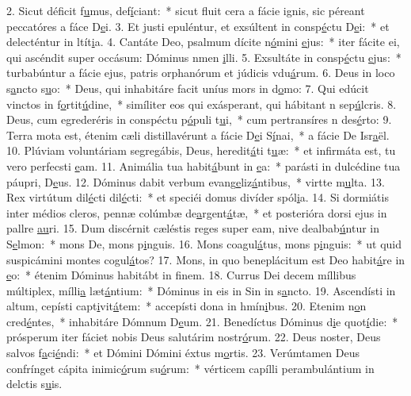2. Sicut déficit f\uline{u}mus, def\uline{í}ciant:~* sicut fluit cera a fácie ignis, sic péreant peccatóres a fáce D\uline{e}i.
3. Et justi epuléntur, et exsúltent in consp\uline{é}ctu D\uline{e}i:~* et delecténtur in ltít\uline{i}a.
4. Cantáte Deo, psalmum dícite n\uline{ó}mini \uline{e}jus:~* iter fácite ei, qui ascéndit super occásum: Dóminus nmen \uline{i}lli.
5. Exsultáte in consp\uline{é}ctu \uline{e}jus:~* turbabúntur a fácie ejus, patris orphanórum et júdicis vdu\uline{á}rum.
6. Deus in loco s\uline{a}ncto s\uline{u}o:~* Deus, qui inhabitáre facit uníus mors in d\uline{o}mo:
7. Qui edúcit vinctos in f\uline{o}rtit\uline{ú}dine,~* simíliter eos qui exásperant, qui hábitant n sep\uline{ú}lcris.
8. Deus, cum egrederéris in conspéctu p\uline{ó}puli t\uline{u}i,~* cum pertransíres n des\uline{é}rto:
9. Terra mota est, étenim cæli distillavérunt a fácie D\uline{e}i S\uline{í}nai,~* a fácie De Isr\uline{a}ël.
10. Plúviam voluntáriam segregábis, Deus, heredit\uline{á}ti t\uline{u}æ:~* et infirmáta est, tu vero perfecsti \uline{e}am.
11. Animália tua habit\uline{á}bunt in \uline{e}a:~* parásti in dulcédine tua páupri, D\uline{e}us.
12. Dóminus dabit verbum evang\uline{e}liz\uline{á}ntibus,~* virtte m\uline{u}lta.
13. Rex virtútum dil\uline{é}cti dil\uline{é}cti:~* et speciéi domus divíder spól\uline{i}a.
14. Si dormiátis inter médios cleros, pennæ colúmbæ de\uline{a}rgent\uline{á}tæ,~* et posterióra dorsi ejus in pallre \uline{au}ri.
15. Dum discérnit cæléstis reges super eam, nive dealbab\uline{ú}ntur in S\uline{e}lmon:~* mons De, mons p\uline{i}nguis.
16. Mons coagul\uline{á}tus, mons p\uline{i}nguis:~* ut quid suspicámini montes cogul\uline{á}tos?
17. Mons, in quo beneplácitum est Deo habit\uline{á}re in \uline{e}o:~* étenim Dóminus habitábt in f\uline{i}nem.
18. Currus Dei decem míllibus múltiplex, mílli\uline{a} læt\uline{á}ntium:~* Dóminus in eis in Sin in s\uline{a}ncto.
19. Ascendísti in altum, cepísti capt\uline{i}vit\uline{á}tem:~* accepísti dona in hmín\uline{i}bus.
20. Etenim n\uline{o}n cred\uline{é}ntes,~* inhabitáre Dómnum D\uline{e}um.
21. Benedíctus Dóminus d\uline{i}e quot\uline{í}die:~* prósperum iter fáciet nobis Deus salutárim nostr\uline{ó}rum.
22. Deus noster, Deus salvos f\uline{a}ci\uline{é}ndi:~* et Dómini Dómini éxtus m\uline{o}rtis.
23. Verúmtamen Deus confrínget cápita inimic\uline{ó}rum su\uline{ó}rum:~* vérticem capílli perambulántium in delctis s\uline{u}is.
